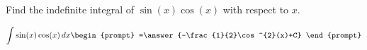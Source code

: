 \documentclass{ximera}
\author{Gregory Hartman \and Matthew Carr}
\begin{document}
\begin{exercise}

Find the indefinite integral of $\sin(x)\cos(x)$ with respect to $x$.

\[
\int \sin(x)\cos(x)\d x
\begin{prompt}
=\answer{-\frac{1}{2}\cos^{2}(x)+C}
\end{prompt}
\]


\end{exercise}
\end{document}
